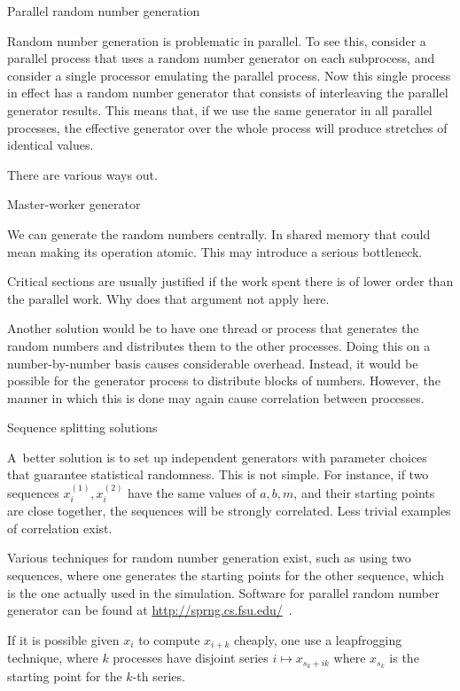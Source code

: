  {Parallel random number generation}

Random number generation is problematic in parallel. To see this,
consider a parallel process that uses a random number generator on
each subprocess, and
consider a single processor emulating the parallel process. Now this
single process in effect has a random number generator that consists
of interleaving the parallel generator results. This means that, if we
use the same generator in all parallel processes, the effective
generator over the whole process will produce stretches of identical
values.

There are various ways out.

 {Master-worker generator}

We can generate the random numbers centrally. In shared memory that could mean
making its operation atomic. This may introduce a serious bottleneck.
\begin{exercise}
  Critical sections are usually justified if the work spent there is of lower order
  than the parallel work. Why does that argument not apply here.
\end{exercise}

Another solution would be to have one thread or process that generates
the random numbers and distributes them to the other processes.
Doing this on a number-by-number basis causes considerable overhead.
Instead, it would be possible for the generator process to distribute
blocks of numbers. However, the manner in which this is done may again
cause correlation between processes.

 {Sequence splitting solutions}

A~better solution is to set up independent generators with
parameter choices that guarantee statistical randomness. This is not
simple. For instance, if two sequences $x^{(1)}_i,x^{(2)}_i$ have the
same values of $a,b,m$, and their starting points are close together,
the sequences will be strongly correlated. Less trivial examples of
correlation exist.

Various techniques for random number generation exist, such as using
two sequences, where one generates the starting points for the other
sequence, which is the one actually used in the simulation. Software
for parallel random number generator can be found at
\url{http://sprng.cs.fsu.edu/}~\cite{Mascagni:SPRNG}.

If it is possible given $x_i$ to compute $x_{i+k}$ cheaply, one use a
leapfrogging technique, where $k$ processes have disjoint series
$i\mapsto x_{s_k+ik}$ where $x_{s_k}$ is the starting point for the
$k$-th series.

